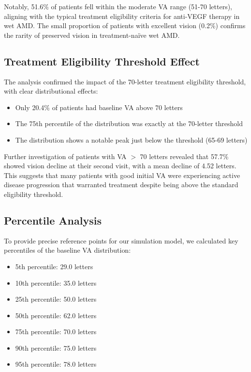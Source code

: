 Notably, 51.6\% of patients fell within the moderate VA range (51-70 letters), aligning with the typical treatment eligibility criteria for anti-VEGF therapy in wet AMD. The small proportion of patients with excellent vision (0.2\%) confirms the rarity of preserved vision in treatment-naïve wet AMD.

\subsection{Treatment Eligibility Threshold Effect}

The analysis confirmed the impact of the 70-letter treatment eligibility threshold, with clear distributional effects:

\begin{itemize}
    \item Only 20.4\% of patients had baseline VA above 70 letters
    \item The 75th percentile of the distribution was exactly at the 70-letter threshold
    \item The distribution shows a notable peak just below the threshold (65-69 letters)
\end{itemize}

Further investigation of patients with VA $>$ 70 letters revealed that 57.7\% showed vision decline at their second visit, with a mean decline of 4.52 letters. This suggests that many patients with good initial VA were experiencing active disease progression that warranted treatment despite being above the standard eligibility threshold.

\subsection{Percentile Analysis}

To provide precise reference points for our simulation model, we calculated key percentiles of the baseline VA distribution:

\begin{itemize}
    \item 5th percentile: 29.0 letters
    \item 10th percentile: 35.0 letters
    \item 25th percentile: 50.0 letters
    \item 50th percentile: 62.0 letters
    \item 75th percentile: 70.0 letters
    \item 90th percentile: 75.0 letters
    \item 95th percentile: 78.0 letters
\end{itemize}


